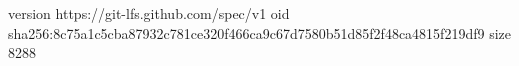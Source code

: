 version https://git-lfs.github.com/spec/v1
oid sha256:8c75a1c5cba87932c781ce320f466ca9c67d7580b51d85f2f48ca4815f219df9
size 8288
